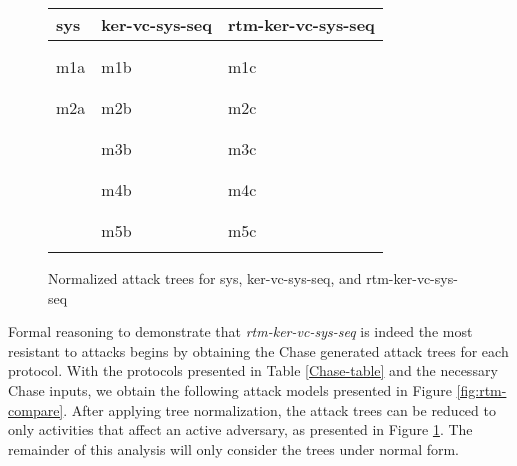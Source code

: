 \documentclass[runningheads]{llncs}
\theoremstyle{definition}
\begin{document}
\setlength{\textfloatsep}{0.1cm}
\begin{figure}[hbtp]
    \begin{center}
        \begin{tabular}{ M{3.6cm} | M{4.1cm} | M{4.1cm} }
                sys & ker-vc-sys-seq & rtm-ker-vc-sys-seq \\
                \hline
                &&\\  &  &  \\ 
                m1a & m1b & m1c \\ 
                &&\\
                 &  &   \\   
                m2a & m2b & m2c \\ 
                &&\\
                &   &  \\  
                  & m3b & m3c \\ 
                 &&\\ 
                  &  &   \\
                 & m4b & m4c \\ 
                &&\\  
                 &  &    \\
                 & m5b & m5c \\ 
                &&\\
            \end{tabular}
    \end{center}
    \caption{Normalized attack trees for sys, ker-vc-sys-seq, and rtm-ker-vc-sys-seq}
    \label{fig:rtm-compare-reduced}
\end{figure}


Formal reasoning to demonstrate that \emph{rtm-ker-vc-sys-seq} is indeed the most resistant to attacks begins by obtaining the Chase generated attack trees for each protocol. With the protocols presented in Table \ref{Chase-table} and the necessary Chase inputs, we obtain the following attack models presented in Figure \ref{fig:rtm-compare}. After applying tree normalization, the attack trees can be reduced to only activities that affect an active adversary, as presented in Figure \ref{fig:rtm-compare-reduced}.  The remainder of this analysis will only consider the trees under normal form. 
\end{document}
